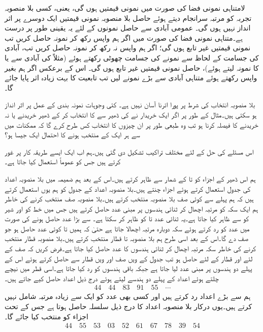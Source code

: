 لامتناہی نمونی فضا کی صورت میں نمونی قیمتیں  ہوں گی، یعنی، کسی بلا منصوبہ تجربہ کو  مرتبہ سرانجام دیتے ہوئے حاصل  بلا منصوبہ نمونی قیمتیں ایک دوسرے پر اثر انداز نہیں ہوں گی۔ عمومی آبادی سے حاصل نمونوں کے لئے یہ یقینی طور پر  درست ہے۔متناہی نمونی فضا کی صورت میں اگر ہم واپس رکھ کر نمونہ حاصل کریں تب نمونی قیمتیں غیر تابع ہوں گی؛ اگر ہم واپس نہ رکھ کر نمونہ حاصل کریں تب،  آبادی کی جسامت کے لحاظ سے نمونے کی جسامت چھوٹی رکھتے ہوئے (مثلاً  کی آبادی سے  یا  کا نمونہ  لیتے ہوئے)، حاصل نمونی قیمتیں  غیر تابع ہوں گی۔ اس کے برعکس اگر ہم بغیر واپس رکھتے ہوئے متناہی آبادی سے بڑے نمونے لیں تب تابعیت کا بہت زیادہ اثر پایا جائے گا۔

بلا منصوبہ انتخاب کی شرط پر پورا اترنا آسان نہیں ہے۔ کئی وجوہات نمونہ بندی کے عمل پر اثر انداز ہو سکتی ہیں۔مثال کے طور پر اگر ایک خریدار نے  کی  ڈھیر سے  کا انتخاب کر کے ڈھیر خریدنے یا نہ خریدنے  کا فیصلہ کرنا ہو  تب وہ طبعی طور پر ان  چیزوں کا انتخاب کس طرح کرے گا کہ  ممکنات میں سے ہر ایک کے منتخب ہونے کا احتمال ایک جیسا ہو؟

اس مسئلے کی حل کے لئے مختلف تراکیب تشکیل دی گئی ہیں۔ہم اب  ایک ایسے طریقہ کار پر غور کرتے ہیں جس کو عموماً استعمال کیا جاتا ہے۔

ہم اس ڈھیر کے اجزاء کو  تا  کے شمار سے ظاہر کرتے ہیں۔اس کے بعد ہم ضمیمہ  میں بلا منصوبہ اعداد کی جدول استعمال کرتے ہوئے  اجزاء چنتے ہیں۔بلا منصوبہ اعداد کے جدول کو ہم یوں استعمال کرتے ہیں کہ ہم پہلے  سے  کوئی صف بلا منصوبہ منتخب کرتے ہیں۔بلا منصوبہ صف منتخب کرنے کی خاطر ہم ایک سکہ کو  مرتبہ اچھال کر  ثنائی ہندسوں پر مبنی عدد حاصل کرتے ہیں جس میں خط کو  اور شیر کو  سے ظاہر کیا جاتا ہے۔یہ ثنائی عدد  تا  کو ظاہر کر سکتا ہے۔ سے بڑا عدد حاصل ہونے کی صورت میں عدد کو رد کرتے ہوئے سکہ دوبارہ  مرتبہ اچھالا جاتا ہے حتیٰ کہ ہمیں  تا  کوئی عدد حاصل ہو جو صف دے گا۔اس کے بعد اسی طرح ہم بلا منصوبہ  تا  قطار منتخب کرتے ہیں۔بلا منصوبہ قطار منتخب کرنے کی خاطر سکہ  مرتبہ اچھال کر  ثنائی ہندسوں کا عدد حاصل کیا جاتا ہے۔فرض کریں کہ صف کے لئے  اور قطار کے لئے  حاصل ہو تب جدول کے  ویں صف اور  ویں قطار سے  حاصل کرتے ہوئے اس کے پہلے دو ہندسوں پر مبنی عدد  لیا جاتا ہے جبکہ باقی ہندسوں کو رد کیا جاتا ہے۔اسی قطر میں نیچے چلتے ہوئے اعداد کے پہلے دو ہندسے لیتے ہوئے درج ذیل اعداد حاصل کیے جاتے ہیں۔
\begin{align*}
44\quad 44\quad 83\quad 91\quad 55\quad \cdots
\end{align*}
ہم  سے بڑے اعداد رد کرتے ہیں اور کسی بھی عدد کو ایک سے زیادہ مرتبہ شامل نہیں کرتے ہیں۔یوں درکار بلا منصوبہ اعداد کا درج ذیل سلسلہ حاصل ہوتا ہے جس کے تحت اجزاء کو منتخب کیا جائے گا۔
\begin{align*}
44\quad 55\quad 53\quad 03\quad 52\quad 61\quad 67\quad 78\quad 39\quad 54
\end{align*}

